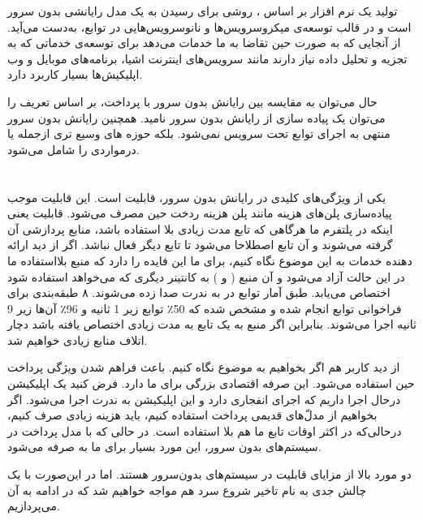 تولید یک نرم افزار بر اساس ، روشی برای رسیدن به یک مدل رایانشی بدون سرور است و در قالب توسعه‌ی میکروسرویس‌ها و نانوسرویس‌هایی در توابع، به‌دست می‌آید. از آنجایی که  به صورت حین تقاضا به ما خدمات می‌دهد برای توسعه‌ی خدماتی که به تجزیه و تحلیل داده نیاز دارند مانند سرویس‌های اینترنت اشیا، برنامه‌های موبایل و وب اپلیکیش‌ها بسیار کاربرد دارد. 

حال می‌توان به مقایسه بین رایانش بدون سرور با  پرداخت، بر اساس تعریف  را می‌توان یک پیاده سازی از رایانش بدون سرور نامید. همچنین رایانش بدون سرور منتهی به اجرای توابع تحت سرویس نمی‌شود. بلکه حوزه های وسیع تری ازجمله  یا درمواردی  را شامل می‌شود. 


\section{}

یکی از ویژگی‌های کلیدی در رایانش بدون سرور، قابلیت  است. این قابلیت موجب پیاده‌سازی پلن‌های هزینه مانند پلن هزینه ردخت حین مصرف می‌شود. قابلیت  یعنی اینکه در پلتفرم ما هرگاهی که تابع مدت زیادی بلا استفاده باشد، منابع پردازشی آن گرفته می‌شوند و آن تابع اصطلاحا  می‌شود تا تابع دیگر فعال نباشد. اگر از دید ارائه دهنده خدمات به این موضوع نگاه کنیم، برای ما این فایده را دارد که منبع بلااستفاده ما در این حالت آزاد می‌شود و آن منبع ( و ) به کانتینر دیگری که می‌خواهد استفاده شود اختصاص می‌یابد. طبق آمار توابع در  به ندرت صدا زده می‌شوند. ۸ طبقه‌بندی برای فراخوانی توابع انجام شده و مشخص شده که 50٪ توابع زیر 1 ثانیه و 96٪ آن‌ها زیر 9 ثانیه اجرا می‌شوند\cite{shahrad2020serverless}. بنابراین اگر منبع به یک تابع به مدت زیادی اختصاص یافته باشد دچار اتلاف منابع زیادی خواهیم شد. 

از دید کاربر هم اگر بخواهیم به موضوع نگاه کنیم.  باعث فراهم شدن ویژگی پرداخت حین استفاده می‌شود. این صرفه اقتصادی بزرگی برای ما دارد. فرض کنید یک اپلیکیشن درحال اجرا داریم که اجرای انفجاری دارد و این اپلیکیشن به ندرت اجرا می‌شود. اگر بخواهیم از مدل‌ّهای قدیمی پرداخت استفاده کنیم، باید هزینه زیادی صرف کنیم، درحالی‌که در اکثر اوقات تابع ما هم بلا استفاده است. در حالی که با مدل پرداخت در سیستم‌های بدون سرور، این مورد بسیار برای ما به صرفه می‌شود. 

دو مورد بالا از مزایای قابلیت  در سیستم‌های بدون‌سرور هستند. اما در این‌صورت با یک چالش جدی به نام تاخیر شروع سرد هم مواجه خواهیم شد که در ادامه به آن می‌پردازیم. 


